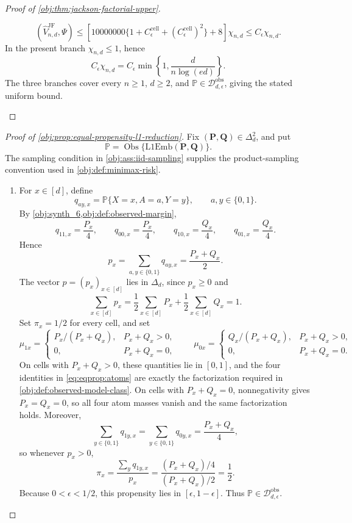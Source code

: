 \documentclass[11pt]{article}
\begin{document}
\begin{proof}[Proof of \cref{obj:thm:jackson-factorial-upper}]
\begin{enumerate}
\[(\widehat V_{n,d}^{\mathrm{JF}},\Psi)
\le
\left[
10000000
\{1+C_{\epsilon}^{\mathrm{cell}}+(C_{\epsilon}^{\mathrm{cell}})^2\}
+8
\right]\chi_{n,d}
\le
C_\epsilon\chi_{n,d}.
\]
In the present branch \(\chi_{n,d}\le1\), hence
\[
C_\epsilon\chi_{n,d}
=
C_\epsilon
\min\left\{1,\frac{d}{n\log(ed)}\right\}.
\]
The three branches cover every \(n\ge1\), \(d\ge2\), and
\(\mathbb P\in\mathcal D_{d,\epsilon}^{\mathrm{obs}}\), giving the stated
uniform bound.
\end{enumerate}
\end{proof}

\begin{proof}[Proof of \cref{obj:prop:equal-propensity-l1-reduction}]
Fix \((\mathbf P,\mathbf Q)\in\Delta_d^2\), and put
\[
\mathbb P=\operatorname{Obs}\{\mathrm{L1Emb}(\mathbf P,\mathbf Q)\}.
\]
The sampling condition in \cref{obj:ass:iid-sampling} supplies the product-sampling convention used in \cref{obj:def:minimax-risk}.

\begin{enumerate}
\item For \(x\in[d]\), define
\[
q_{ay,x}=\mathbb P\{X=x,A=a,Y=y\},
\qquad a,y\in\{0,1\}.
\]
By \cref{obj:synth_6,obj:def:observed-margin},
\begin{equation}
\label{eq:eqprop:atoms}
q_{11,x}=\frac{P_x}{4},
\qquad
q_{00,x}=\frac{P_x}{4},
\qquad
q_{10,x}=\frac{Q_x}{4},
\qquad
q_{01,x}=\frac{Q_x}{4}.
\end{equation}
Hence
\[
p_x=\sum_{a,y\in\{0,1\}}q_{ay,x}
=\frac{P_x+Q_x}{2}.
\]
The vector \(p=(p_x)_{x\in[d]}\) lies in \(\Delta_d\), since \(p_x\ge0\) and
\[
\sum_{x\in[d]}p_x
=
\frac12\sum_{x\in[d]}P_x+\frac12\sum_{x\in[d]}Q_x
=1.
\]
Set \(\pi_x=1/2\) for every cell, and set
\[
\mu_{1x}=
\begin{cases}
P_x/(P_x+Q_x),& P_x+Q_x>0,\\
0,& P_x+Q_x=0,
\end{cases}
\qquad
\mu_{0x}=
\begin{cases}
Q_x/(P_x+Q_x),& P_x+Q_x>0,\\
0,& P_x+Q_x=0.
\end{cases}
\]
On cells with \(P_x+Q_x>0\), these quantities lie in \([0,1]\), and the four identities in
\cref{eq:eqprop:atoms} are exactly the factorization required in \cref{obj:def:observed-model-class}.
On cells with \(P_x+Q_x=0\), nonnegativity gives \(P_x=Q_x=0\), so all four atom masses vanish and
the same factorization holds. Moreover,
\[
\sum_{y\in\{0,1\}}q_{1y,x}
=
\sum_{y\in\{0,1\}}q_{0y,x}
=
\frac{P_x+Q_x}{4},
\]
so whenever \(p_x>0\),
\[
\pi_x
=
\frac{\sum_y q_{1y,x}}{p_x}
=
\frac{(P_x+Q_x)/4}{(P_x+Q_x)/2}
=
\frac12.
\]
Because \(0<\epsilon<1/2\), this propensity lies in \([\epsilon,1-\epsilon]\). Thus
\(\mathbb P\in\mathcal D_{d,\epsilon}^{\mathrm{obs}}\). %


\end{enumerate}
\end{proof}
\end{document}
